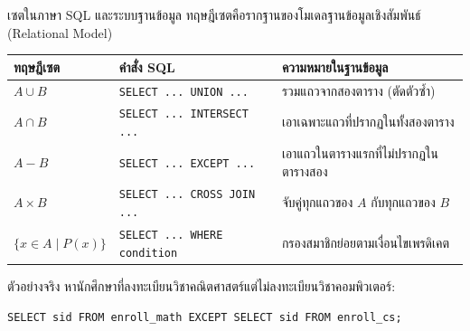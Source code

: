 \begin{frame}{เซตในภาษา SQL และระบบฐานข้อมูล}
  ทฤษฎีเซตคือรากฐานของโมเดลฐานข้อมูลเชิงสัมพันธ์ (Relational Model)
  \begin{center}\small
  \begin{tabular}{|l|l|l|}
    \hline
    \textbf{ทฤษฎีเซต} & \textbf{คำสั่ง SQL} & \textbf{ความหมายในฐานข้อมูล} \\ \hline
    $A \cup B$ & \texttt{SELECT ... UNION ...} & รวมแถวจากสองตาราง (ตัดตัวซ้ำ) \\ \hline
    $A \cap B$ & \texttt{SELECT ... INTERSECT ...} & เอาเฉพาะแถวที่ปรากฏในทั้งสองตาราง \\ \hline
    $A - B$ & \texttt{SELECT ... EXCEPT ...} & เอาแถวในตารางแรกที่ไม่ปรากฏในตารางสอง \\ \hline
    $A \times B$ & \texttt{SELECT ... CROSS JOIN ...} & จับคู่ทุกแถวของ $A$ กับทุกแถวของ $B$ \\ \hline
    $\{x \in A \mid P(x)\}$ & \texttt{SELECT ... WHERE condition} & กรองสมาชิกย่อยตามเงื่อนไขเพรดิเคต \\ \hline
  \end{tabular}
  \end{center}
  \vspace{0.2em}
  \begin{exampleblock}{ตัวอย่างจริง}
    หานักศึกษาที่ลงทะเบียนวิชาคณิตศาสตร์แต่ไม่ลงทะเบียนวิชาคอมพิวเตอร์:
    \begin{center}
      \texttt{SELECT sid FROM enroll\_math EXCEPT SELECT sid FROM enroll\_cs;}
    \end{center}
  \end{exampleblock}
\end{frame}

